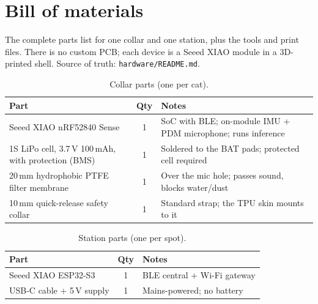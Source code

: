 \section{Bill of materials}
\label{sec:appendix-bom}

The complete parts list for one collar and one station, plus the tools and print files. There is no
custom PCB; each device is a Seeed XIAO module in a 3D-printed shell. Source of truth:
\texttt{hardware/README.md}.

\begin{table}[ht]
  \centering
  \caption{Collar parts (one per cat).}
  \label{tab:bom-collar}
  \begin{tabularx}{\textwidth}{@{}lcX@{}}
    \toprule
    \textbf{Part} & \textbf{Qty} & \textbf{Notes} \\
    \midrule
    Seeed XIAO nRF52840 Sense & 1 & SoC with BLE; on-module IMU + PDM microphone; runs inference \\
    1S LiPo cell, 3.7\,V 100\,mAh, with protection (BMS) & 1 & Soldered to the BAT pads; protected cell required \\
    20\,mm hydrophobic PTFE filter membrane & 1 & Over the mic hole; passes sound, blocks water/dust \\
    10\,mm quick-release safety collar & 1 & Standard strap; the TPU skin mounts to it \\
    \bottomrule
  \end{tabularx}
\end{table}

\begin{table}[ht]
  \centering
  \caption{Station parts (one per spot).}
  \label{tab:bom-station}
  \begin{tabularx}{\textwidth}{@{}lcX@{}}
    \toprule
    \textbf{Part} & \textbf{Qty} & \textbf{Notes} \\
    \midrule
    Seeed XIAO ESP32-S3 & 1 & BLE central + Wi-Fi gateway \\
    USB-C cable + 5\,V supply & 1 & Mains-powered; no battery \\
    \bottomrule
  \end{tabularx}
\end{table}

